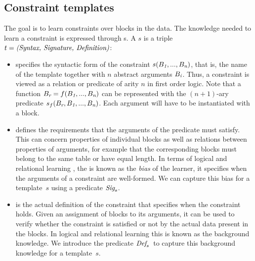 \newcommand{\sigc}{\ensuremath{\format{Sig}_s}}
\newcommand{\defc}{\ensuremath{\format{Def}_s}}

\subsection{Constraint templates}
The goal is to learn constraints over blocks in the data. The knowledge needed to learn a constraint is expressed through {\template}s.
%
A \template $s$ is a triple $t = \textit{(Syntax, Signature, Definition)}$:
\begin{itemize}
\item
\textit{\CName}  specifies the syntactic form of the constraint $s(B_{\textit{1}}, ...,B_{\textit{n}})$, that is, the name of the template together
with $n$ abstract arguments $B_{\textit{i}}$.
Thus, a constraint is viewed as a relation or predicate of arity $n$ in first order logic.
Note that a function $B_{\textit{r}}=f(B_{\textit{1}},...,B_{\textit{n}})$ can be represented with the $(n{+}1)$-ary predicate $s_f(B_{\textit{r}},B_{\textit{1}},...,B_{\textit{n}})$.
Each argument will have to be instantiated with a block.

\item \textit{\CSignature} defines the requirements that the arguments of the predicate must satisfy.
This can concern properties of individual blocks as well as relations between properties of arguments, for example that the corresponding blocks must belong to the same table or have equal length.
In terms of logical and relational learning \cite{luc_book}, the \CSignature is known as the {\em bias} of the learner, it specifies when the arguments of a constraint are well-formed.
We can capture this bias for a template~$s$ using a predicate $\sigc$.
\item \textit{\CFunction} is the actual definition of the constraint that specifies when the constraint holds.
Given an assignment of blocks to its arguments, it can be used to verify whether the constraint is satisfied or not by the actual data present in the blocks. %
In logical and relational learning this is known as the background knowledge.
We introduce the predicate \defc~to capture this background knowledge for a template~$s$.
\end{itemize}

